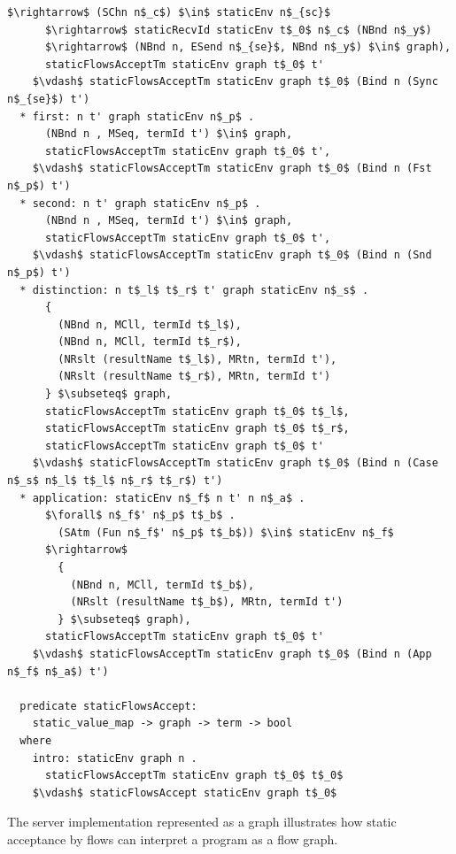 \documentclass[letterpaper, 11pt]{extarticle}
\begin{document}
\begin{lstlisting}[language=logic, mathescape]
      $\rightarrow$ (SChn n$_c$) $\in$ staticEnv n$_{sc}$
      $\rightarrow$ staticRecvId staticEnv t$_0$ n$_c$ (NBnd n$_y$)
      $\rightarrow$ (NBnd n, ESend n$_{se}$, NBnd n$_y$) $\in$ graph),
      staticFlowsAcceptTm staticEnv graph t$_0$ t'
    $\vdash$ staticFlowsAcceptTm staticEnv graph t$_0$ (Bind n (Sync n$_{se}$) t')
  * first: n t' graph staticEnv n$_p$ .
      (NBnd n , MSeq, termId t') $\in$ graph,
      staticFlowsAcceptTm staticEnv graph t$_0$ t',
    $\vdash$ staticFlowsAcceptTm staticEnv graph t$_0$ (Bind n (Fst n$_p$) t')
  * second: n t' graph staticEnv n$_p$ .
      (NBnd n , MSeq, termId t') $\in$ graph,
      staticFlowsAcceptTm staticEnv graph t$_0$ t',
    $\vdash$ staticFlowsAcceptTm staticEnv graph t$_0$ (Bind n (Snd n$_p$) t')
  * distinction: n t$_l$ t$_r$ t' graph staticEnv n$_s$ .
      {
        (NBnd n, MCll, termId t$_l$),
        (NBnd n, MCll, termId t$_r$),
        (NRslt (resultName t$_l$), MRtn, termId t'),
        (NRslt (resultName t$_r$), MRtn, termId t')
      } $\subseteq$ graph,
      staticFlowsAcceptTm staticEnv graph t$_0$ t$_l$,
      staticFlowsAcceptTm staticEnv graph t$_0$ t$_r$,
      staticFlowsAcceptTm staticEnv graph t$_0$ t'
    $\vdash$ staticFlowsAcceptTm staticEnv graph t$_0$ (Bind n (Case n$_s$ n$_l$ t$_l$ n$_r$ t$_r$) t')
  * application: staticEnv n$_f$ n t' n n$_a$ .
      $\forall$ n$_f$' n$_p$ t$_b$ . 
        (SAtm (Fun n$_f$' n$_p$ t$_b$)) $\in$ staticEnv n$_f$
      $\rightarrow$
        {
          (NBnd n, MCll, termId t$_b$),
          (NRslt (resultName t$_b$), MRtn, termId t')
        } $\subseteq$ graph),
      staticFlowsAcceptTm staticEnv graph t$_0$ t'
    $\vdash$ staticFlowsAcceptTm staticEnv graph t$_0$ (Bind n (App n$_f$ n$_a$) t')

  predicate staticFlowsAccept:
    static_value_map -> graph -> term -> bool
  where
    intro: staticEnv graph n .
      staticFlowsAcceptTm staticEnv graph t$_0$ t$_0$
    $\vdash$ staticFlowsAccept staticEnv graph t$_0$ 

\end{lstlisting}

The server implementation represented as a graph illustrates how static acceptance by
flows can interpret a program as a flow graph.
\end{document}
